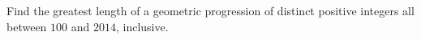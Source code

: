 Find the greatest length of a geometric progression of distinct positive integers all between $100$ and $2014$, inclusive.
